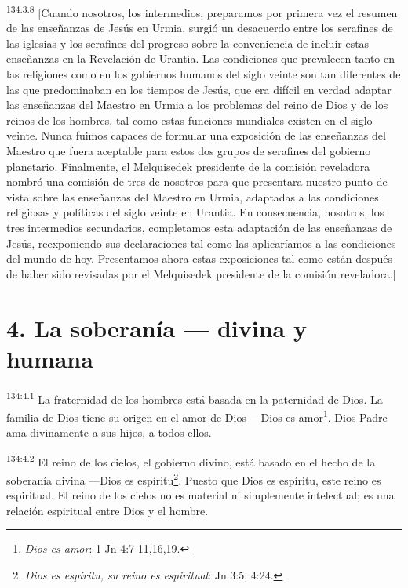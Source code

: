 \par
\textsuperscript{134:3.8} [Cuando nosotros, los intermedios, preparamos por primera vez el resumen de las enseñanzas de Jesús en Urmia, surgió un desacuerdo entre los serafines de las iglesias y los serafines del progreso sobre la conveniencia de incluir estas enseñanzas en la Revelación de Urantia. Las condiciones que prevalecen tanto en las religiones como en los gobiernos humanos del siglo veinte son tan diferentes de las que predominaban en los tiempos de Jesús, que era difícil en verdad adaptar las enseñanzas del Maestro en Urmia a los problemas del reino de Dios y de los reinos de los hombres, tal como estas funciones mundiales existen en el siglo veinte. Nunca fuimos capaces de formular una exposición de las enseñanzas del Maestro que fuera aceptable para estos dos grupos de serafines del gobierno planetario. Finalmente, el Melquisedek presidente de la comisión reveladora nombró una comisión de tres de nosotros para que presentara nuestro punto de vista sobre las enseñanzas del Maestro en Urmia, adaptadas a las condiciones religiosas y políticas del siglo veinte en Urantia. En consecuencia, nosotros, los tres intermedios secundarios, completamos esta adaptación de las enseñanzas de Jesús, reexponiendo sus declaraciones tal como las aplicaríamos a las condiciones del mundo de hoy. Presentamos ahora estas exposiciones tal como están después de haber sido revisadas por el Melquisedek presidente de la comisión reveladora.]

\section*{4. La soberanía --- divina y humana}
\par
\textsuperscript{134:4.1} La fraternidad de los hombres está basada en la paternidad de Dios. La familia de Dios tiene su origen en el amor de Dios ---Dios es amor\footnote{\textit{Dios es amor}: 1 Jn 4:7-11,16,19.}. Dios Padre ama divinamente a sus hijos, a todos ellos.

\par
\textsuperscript{134:4.2} El reino de los cielos, el gobierno divino, está basado en el hecho de la soberanía divina ---Dios es espíritu\footnote{\textit{Dios es espíritu, su reino es espiritual}: Jn 3:5; 4:24.}. Puesto que Dios es espíritu, este reino es espiritual. El reino de los cielos no es material ni simplemente intelectual; es una relación espiritual entre Dios y el hombre.

